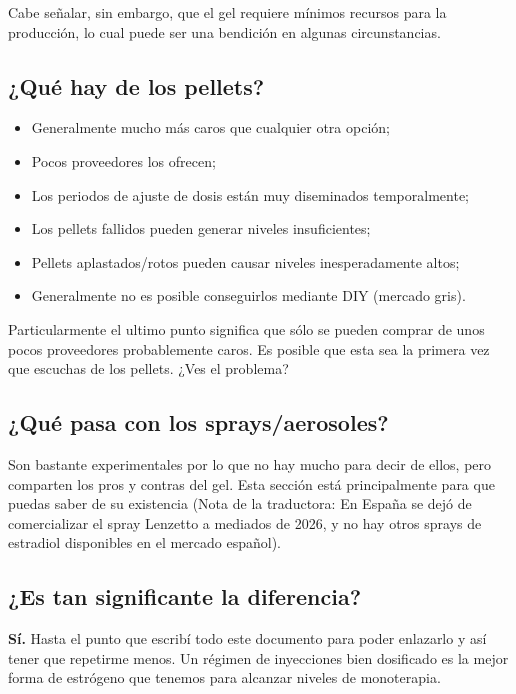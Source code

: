 \documentclass{article}
\begin{document}
Cabe señalar, sin embargo, que el gel requiere mínimos recursos para la producción, lo cual puede ser una bendición en algunas circunstancias.

\subsection{¿Qué hay de los pellets?}

\begin{itemize}
  \item Generalmente mucho más caros que cualquier otra opción;
  \item Pocos proveedores los ofrecen;
  \item Los periodos de ajuste de dosis están muy diseminados temporalmente;
  \item Los pellets fallidos pueden generar niveles insuficientes;
  \item Pellets aplastados/rotos pueden causar niveles inesperadamente altos;
  \item Generalmente no es posible conseguirlos mediante DIY (mercado gris).
\end{itemize}

Particularmente el ultimo punto significa que sólo se pueden comprar de unos pocos proveedores probablemente caros. Es posible que esta sea la primera vez que escuchas de los pellets. ¿Ves el problema?

\subsection{¿Qué pasa con los sprays/aerosoles?}

Son bastante experimentales por lo que no hay mucho para decir de ellos, pero comparten los pros y contras del gel. Esta sección está principalmente para que puedas saber de su existencia (Nota de la traductora: En España se dejó de comercializar el spray Lenzetto a mediados de 2026, y no hay otros sprays de estradiol disponibles en el mercado español).

\subsection{¿Es tan significante la diferencia?}

\textbf{Sí.} Hasta el punto que escribí todo este documento para poder enlazarlo y así tener que repetirme menos. Un régimen de inyecciones bien dosificado es la mejor forma de estrógeno que tenemos para alcanzar niveles de monoterapia.
\end{document}
